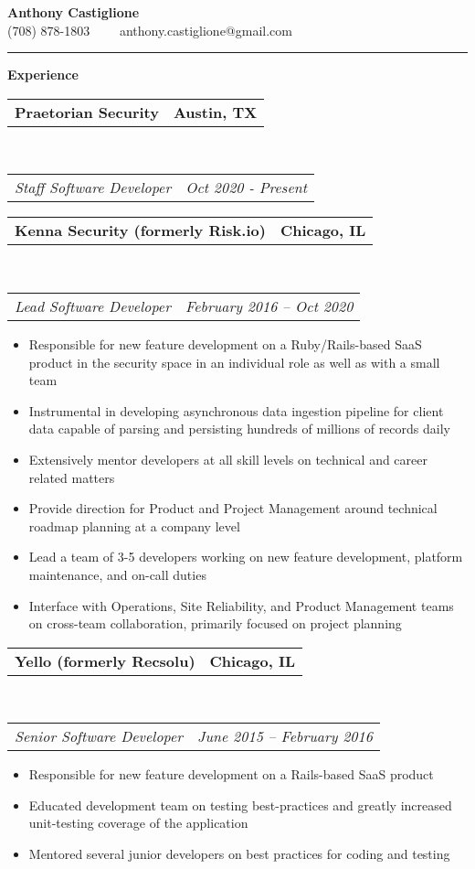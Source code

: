 \documentclass[10pt,letterpaper]{article}
\makeatletter
\newcommand{\headerrow}[2]
{\begin{tabular*}{\linewidth}{l@{\extracolsep{\fill}}r}
	#1 &
	#2 \\
\end{tabular*}}
\newenvironment{indentsection}[1]%
{\begin{list}{}%
	{\setlength{\leftmargin}{#1}}%
	\item[]%
}
{\end{list}}
\makeatother
\begin{document}
\begin{center}
{\LARGE \textbf {Anthony Castiglione}} \\ (708) 878-1803 \ \ \textbullet \ \ anthony.castiglione@gmail.com
	\end{center}
\hrule
\vspace{0.2in}
{\large \textbf{Experience}}

\begin{indentsection}{\parindent}
	\headerrow
		{\textbf{Praetorian Security} }
		{\textbf{Austin, TX}}
	\\
	\headerrow
		{\emph{Staff Software Developer}}
		{\emph{Oct 2020 - Present}}

	\headerrow
		{\textbf{Kenna Security (formerly Risk.io)} }
		{\textbf{Chicago, IL}}
	\\
	\headerrow
		{\emph{Lead Software Developer}}
		{\emph{February 2016 -- Oct 2020}}

	\begin{itemize}
	\renewcommand{\labelitemi}{$-$}
	\vspace{-0.1in}
    \item Responsible for new feature development on a Ruby/Rails-based SaaS product in the security space in an individual role as well as with a small team
    \item Instrumental in developing asynchronous data ingestion pipeline for client data capable of parsing and persisting hundreds of millions of records daily
    \item Extensively mentor developers at all skill levels on technical and career related matters
    \item Provide direction for Product and Project Management around technical roadmap planning at a company level
    \item Lead a team of 3-5 developers working on new feature development, platform maintenance, and on-call duties
    \item Interface with Operations, Site Reliability, and Product Management teams on cross-team collaboration, primarily focused on project planning
	\end{itemize}
\end{indentsection}

\begin{indentsection}{\parindent}
	\headerrow
		{\textbf{Yello (formerly Recsolu)} }
		{\textbf{Chicago, IL}}
	\\
	\headerrow
		{\emph{Senior Software Developer}}
		{\emph{June 2015 -- February 2016}}

	\begin{itemize}
	\renewcommand{\labelitemi}{$-$}
	\vspace{-0.1in}
    \item Responsible for new feature development on a Rails-based SaaS product
    \item Educated development team on testing best-practices and greatly increased unit-testing coverage of the application
    \item Mentored several junior developers on best practices for coding and testing
	\end{itemize}
\end{indentsection}
\end{document}
